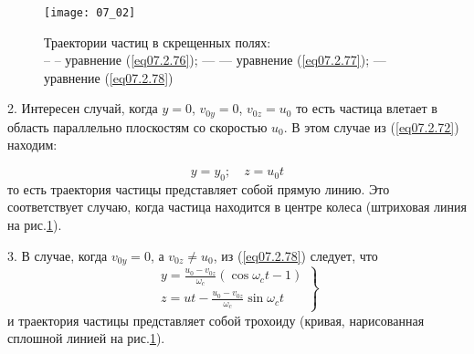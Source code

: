 \begin{figure}[h!]
	\center
	\texttt{[image: 07\_02]}
	\caption{Траектории частиц в скрещенных полях: \\
		-- -- уравнение (\ref{eq07.2.76}); --- --- уравнение 
		(\ref{eq07.2.77}); --- уравнение (\ref{eq07.2.78})}
	\label{img07.2}
\end{figure}

2. Интересен случай, когда \( y = 0 \), \( v_{0y} = 0 \), \( v_{0z} = u_0 \) 
то есть частица влетает в область параллельно плоскостям со скоростью 
\( u_0 \). В этом случае из (\ref{eq07.2.72}) находим:

\begin{equation}
	y = y_0; \quad
	z = u_0 t
	\label{eq07.2.77}
\end{equation}
то есть траектория частицы представляет собой прямую линию. Это соответствует 
случаю, когда частица находится в центре колеса (штриховая линия 
на рис.\ref{img07.2}).

3. В случае, когда \( v_{0y} = 0 \), а \( v_{0z} \neq u_0\), из 
(\ref{eq07.2.78}) следует, что
\begin{equation}
	\left. \begin{array}{c}
		y = \frac{u_0-v_{0z}}{\omega_c}(\cos\omega_c t - 1) \\
		z = ut - \frac{u_0-v_{0z}}{\omega_c}\sin\omega_c t
	\end{array} \right\}
	\label{eq07.2.78}
\end{equation}
и траектория частицы представляет собой трохоиду (кривая, нарисованная 
сплошной линией на рис.\ref{img07.2}).